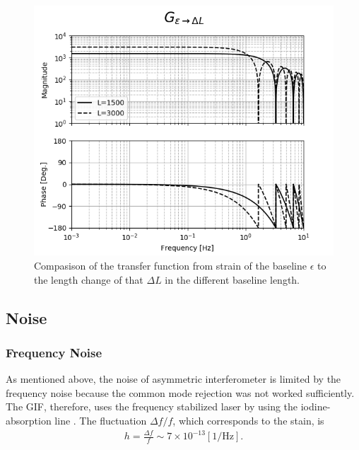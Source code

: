 \begin{figure}[p]
  \begin{center}
    \includegraphics[width=13.0cm]{./img_chap4/img412.png}
    \caption{Compasison of the transfer function from strain of the baseline $\epsilon$ to the length change of that $\Delta{L}$ in the different baseline length.}\label{img:img411_a}
  \end{center}
\end{figure}

\subsection{Noise}
\subsubsection{Frequency Noise} \label{sec:123}
As mentioned above, the noise of asymmetric interferometer is limited by the frequency noise because the common mode rejection was not worked sufficiently. The GIF, therefore, uses the frequency stabilized laser by using the iodine-absorption line \cite{araya2017design}. The fluctuation $\Delta{f}/f$, which corresponds to the stain, is
\begin{eqnarray}
  h = \frac{\Delta{f}}{f} \sim 7\times10^{-13} [\mathrm{1/\mathrm{Hz}}].
\end{eqnarray}

